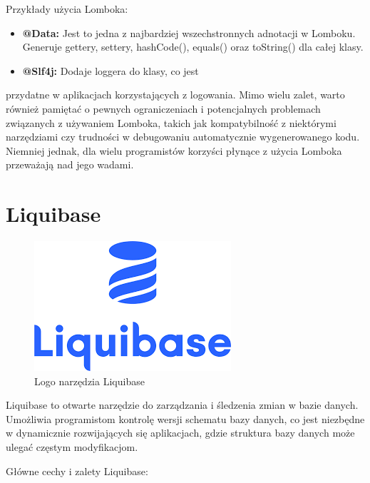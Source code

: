 Przykłady użycia Lomboka:

\begin{itemize}
\item \textbf{@Data:} Jest to jedna z najbardziej wszechstronnych adnotacji w Lomboku. Generuje gettery, settery, hashCode(), equals() oraz toString() dla całej klasy.
\item \textbf{@Slf4j:} Dodaje loggera do klasy, co jest
\end{itemize} przydatne w aplikacjach korzystających z logowania.
Mimo wielu zalet, warto również pamiętać o pewnych ograniczeniach i potencjalnych problemach związanych z używaniem Lomboka, takich jak kompatybilność z niektórymi narzędziami czy trudności w debugowaniu automatycznie wygenerowanego kodu. Niemniej jednak, dla wielu programistów korzyści płynące z użycia Lomboka przeważają nad jego wadami.

\section{Liquibase}
\begin{figure}[h]
    \centering
    \includegraphics[width=0.4\linewidth]{./img/liquibase.png}
    \caption{Logo narzędzia Liquibase}
    \label{fig:Liquibase}
\end{figure}
Liquibase to otwarte narzędzie do zarządzania i śledzenia zmian w bazie danych. Umożliwia programistom kontrolę wersji schematu bazy danych, co jest niezbędne w dynamicznie rozwijających się aplikacjach, gdzie struktura bazy danych może ulegać częstym modyfikacjom.

Główne cechy i zalety Liquibase:

